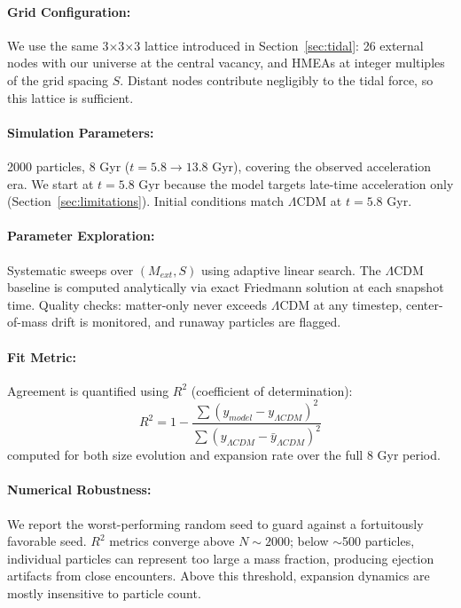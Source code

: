 \documentclass{article}
\begin{document}
\paragraph{Grid Configuration:}
We use the same 3$\times$3$\times$3 lattice introduced in Section~\ref{sec:tidal}: 26 external nodes with our universe at the central vacancy, and HMEAs at integer multiples of the grid spacing $S$.
Distant nodes contribute negligibly to the tidal force, so this lattice is sufficient.

\paragraph{Simulation Parameters:}
2000 particles, 8 Gyr ($t = 5.8 \rightarrow 13.8$ Gyr), covering the observed acceleration era.
We start at $t = 5.8$ Gyr because the model targets late-time acceleration only (Section~\ref{sec:limitations}).
Initial conditions match $\Lambda$CDM at $t = 5.8$ Gyr.

\paragraph{Parameter Exploration:}
Systematic sweeps over $(M_{ext}, S)$ using adaptive linear search.
The $\Lambda$CDM baseline is computed analytically via exact Friedmann solution at each snapshot time.
Quality checks: matter-only never exceeds $\Lambda$CDM at any timestep, center-of-mass drift is monitored, and runaway particles are flagged.

\paragraph{Fit Metric:}
Agreement is quantified using $R^2$ (coefficient of determination):
\[
R^2 = 1 - \frac{\sum (y_{model} - y_{\Lambda CDM})^2}{\sum (y_{\Lambda CDM} - \bar{y}_{\Lambda CDM})^2}
\]
computed for both size evolution and expansion rate over the full 8 Gyr period.

\paragraph{Numerical Robustness:}
We report the worst-performing random seed to guard against a fortuitously favorable seed.
$R^2$ metrics converge above $N \sim 2000$; below $\sim$500 particles, individual particles can represent too large a mass fraction, producing ejection artifacts from close encounters.
Above this threshold, expansion dynamics are mostly insensitive to particle count.
\end{document}
